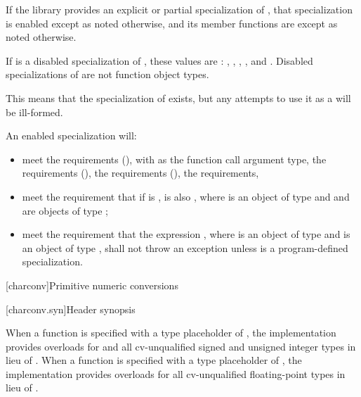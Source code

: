 \pnum
If the library provides an explicit or partial specialization of ,
that specialization is enabled except as noted otherwise,
and its member functions are  except as noted otherwise.

\pnum
If  is a disabled specialization of ,
these values are :
,
,
,
, and
.
Disabled specializations of 
are not function object types.
\begin{note}
This means that the specialization of  exists, but
any attempts to use it as a  will be ill-formed.
\end{note}

\pnum
An enabled specialization  will:
\begin{itemize}
\item meet the  requirements (),
with  as the function
call argument type, the  requirements (),
the  requirements (),
the  requirements,
\item meet the requirement that if  is ,  is
also , where  is an object of type  and  and 
are objects of type ;
\item meet the requirement that the expression , where 
is an object of type  and  is an object of type
, shall not throw an exception unless  is a
program-defined specialization.
\end{itemize}

[charconv]{Primitive numeric conversions}

[charconv.syn]{Header  synopsis}

\pnum
When a function is specified
with a type placeholder of ,
the implementation provides overloads
for  and all cv-unqualified signed and unsigned integer types
in lieu of .
When a function is specified
with a type placeholder of ,
the implementation provides overloads
for all cv-unqualified floating-point types
in lieu of .

